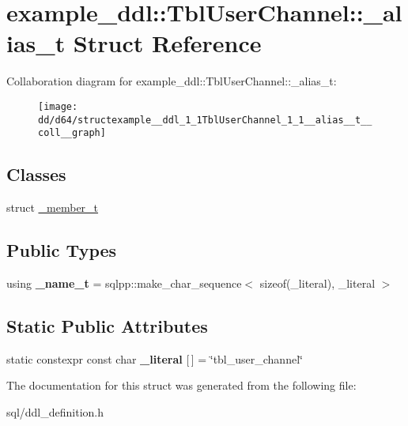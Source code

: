 \hypertarget{structexample__ddl_1_1TblUserChannel_1_1__alias__t}{}\section{example\+\_\+ddl\+:\+:Tbl\+User\+Channel\+:\+:\+\_\+alias\+\_\+t Struct Reference}
\label{structexample__ddl_1_1TblUserChannel_1_1__alias__t}


Collaboration diagram for example\+\_\+ddl\+:\+:Tbl\+User\+Channel\+:\+:\+\_\+alias\+\_\+t\+:
\nopagebreak
\begin{figure}[H]
\begin{center}
\leavevmode
\texttt{[image: dd/d64/structexample\_\_ddl\_1\_1TblUserChannel\_1\_1\_\_alias\_\_t\_\_coll\_\_graph]}
\end{center}
\end{figure}
\subsection*{Classes}
\begin{DoxyCompactItemize}
\item 
struct \hyperlink{structexample__ddl_1_1TblUserChannel_1_1__alias__t_1_1__member__t}{\+\_\+member\+\_\+t}
\end{DoxyCompactItemize}
\subsection*{Public Types}
\begin{DoxyCompactItemize}
\item 
\hypertarget{structexample__ddl_1_1TblUserChannel_1_1__alias__t_a337f033fe5bfbe706e856005bb45adc9}{}using {\bfseries \+\_\+name\+\_\+t} = sqlpp\+::make\+\_\+char\+\_\+sequence$<$ sizeof(\+\_\+literal), \+\_\+literal $>$\label{structexample__ddl_1_1TblUserChannel_1_1__alias__t_a337f033fe5bfbe706e856005bb45adc9}

\end{DoxyCompactItemize}
\subsection*{Static Public Attributes}
\begin{DoxyCompactItemize}
\item 
\hypertarget{structexample__ddl_1_1TblUserChannel_1_1__alias__t_a1c90625068fa5a1b870bdcf2b994041f}{}static constexpr const char {\bfseries \+\_\+literal} \mbox{[}$\,$\mbox{]} = \char`\"{}tbl\+\_\+user\+\_\+channel\char`\"{}\label{structexample__ddl_1_1TblUserChannel_1_1__alias__t_a1c90625068fa5a1b870bdcf2b994041f}

\end{DoxyCompactItemize}


The documentation for this struct was generated from the following file\+:\begin{DoxyCompactItemize}
\item 
sql/ddl\+\_\+definition.\+h\end{DoxyCompactItemize}
